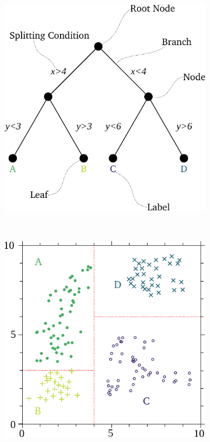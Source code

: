 \begin{figure}[H]
	\centering
	\begin{subfigure}[c]{0.45\textwidth}
		\includegraphics[width=\textwidth]{figures/decisiontree.pdf}
		\label{fig:decisiontreegrapha}
		\subcaption{}
	\end{subfigure}\noindent
	~
	\begin{subfigure}[c]{0.45\textwidth}
		\includegraphics[width=\textwidth]{figures/decisiontreegraph.pdf}

\end{subfigure}
\end{figure}
